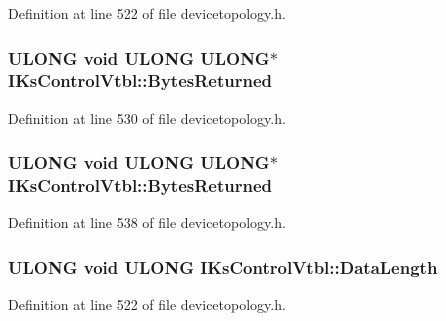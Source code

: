 Definition at line 522 of file devicetopology.\+h.

\subsubsection[{\texorpdfstring{Bytes\+Returned}{BytesReturned}}]{ {\bf U\+L\+O\+NG} {\bf void} {\bf U\+L\+O\+NG} {\bf U\+L\+O\+NG}$\ast$ I\+Ks\+Control\+Vtbl\+::\+Bytes\+Returned}\hypertarget{struct_i_ks_control_vtbl_a43bf12be4ccdf73f90ee0494735a7177}{}\label{struct_i_ks_control_vtbl_a43bf12be4ccdf73f90ee0494735a7177}


Definition at line 530 of file devicetopology.\+h.

\subsubsection[{\texorpdfstring{Bytes\+Returned}{BytesReturned}}]{ {\bf U\+L\+O\+NG} {\bf void} {\bf U\+L\+O\+NG} {\bf U\+L\+O\+NG}$\ast$ I\+Ks\+Control\+Vtbl\+::\+Bytes\+Returned}\hypertarget{struct_i_ks_control_vtbl_ab4ae0495eba78fa8c23f76afaf13d7be}{}\label{struct_i_ks_control_vtbl_ab4ae0495eba78fa8c23f76afaf13d7be}


Definition at line 538 of file devicetopology.\+h.

\subsubsection[{\texorpdfstring{Data\+Length}{DataLength}}]{ {\bf U\+L\+O\+NG} {\bf void} {\bf U\+L\+O\+NG} I\+Ks\+Control\+Vtbl\+::\+Data\+Length}\hypertarget{struct_i_ks_control_vtbl_ab39a430f94b3026b82f40e7a6a9061b9}{}\label{struct_i_ks_control_vtbl_ab39a430f94b3026b82f40e7a6a9061b9}


Definition at line 522 of file devicetopology.\+h.

